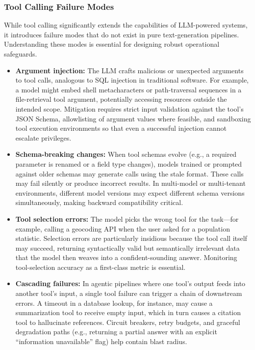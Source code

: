 \subsubsection{Tool Calling Failure Modes}

While tool calling significantly extends the capabilities of LLM-powered systems, it introduces failure modes that do not exist in pure text-generation pipelines. Understanding these modes is essential for designing robust operational safeguards.

\begin{itemize}
  \item \textbf{Argument injection:} The LLM crafts malicious or unexpected arguments to tool calls, analogous to SQL injection in traditional software. For example, a model might embed shell metacharacters or path-traversal sequences in a file-retrieval tool argument, potentially accessing resources outside the intended scope. Mitigation requires strict input validation against the tool's JSON Schema, allowlisting of argument values where feasible, and sandboxing tool execution environments so that even a successful injection cannot escalate privileges.

  \item \textbf{Schema-breaking changes:} When tool schemas evolve (e.g., a required parameter is renamed or a field type changes), models trained or prompted against older schemas may generate calls using the stale format. These calls may fail silently or produce incorrect results. In multi-model or multi-tenant environments, different model versions may expect different schema versions simultaneously, making backward compatibility critical.

  \item \textbf{Tool selection errors:} The model picks the wrong tool for the task---for example, calling a geocoding API when the user asked for a population statistic. Selection errors are particularly insidious because the tool call itself may succeed, returning syntactically valid but semantically irrelevant data that the model then weaves into a confident-sounding answer. Monitoring tool-selection accuracy as a first-class metric is essential.

  \item \textbf{Cascading failures:} In agentic pipelines where one tool's output feeds into another tool's input, a single tool failure can trigger a chain of downstream errors. A timeout in a database lookup, for instance, may cause a summarization tool to receive empty input, which in turn causes a citation tool to hallucinate references. Circuit breakers, retry budgets, and graceful degradation paths (e.g., returning a partial answer with an explicit ``information unavailable'' flag) help contain blast radius.


\end{itemize}
